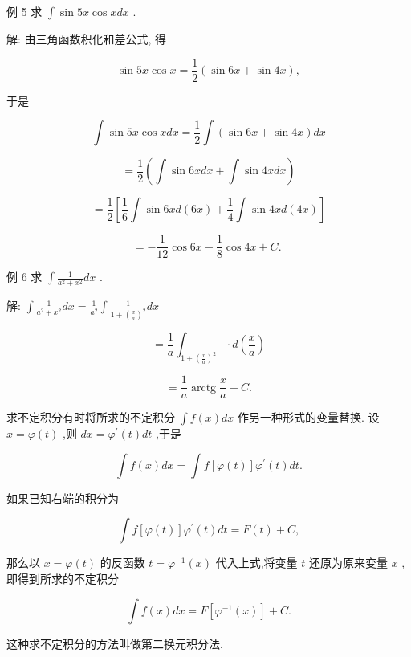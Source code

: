 \documentclass[lang=cn,newtx,12pt,scheme=chinese]{elegantbook}
\begin{document}
例 5 求 \(\int \sin {5x}\cos {xdx}\) .

解: 由三角函数积化和差公式, 得

\[
\sin {5x}\cos x = \frac{1}{2}\left( {\sin {6x} + \sin {4x}}\right) ,
\]

于是

\[
\int \sin {5x}\cos {xdx} = \frac{1}{2}\int \left( {\sin {6x} + \sin {4x}}\right) {dx}
\]

\[
= \frac{1}{2}\left( {\int \sin {6xdx}+\int \sin {4xdx}}\right)
\]

\[
= \frac{1}{2}\left\lbrack {\frac{1}{6}\int \sin {6xd}\left( {6x}\right) + \frac{1}{4}\int \sin {4xd}\left( {4x}\right) }\right\rbrack
\]

\[
= - \frac{1}{12}\cos {6x} - \frac{1}{8}\cos {4x} + C\text{. }
\]

例 6 求 \(\int \frac{1}{{a}^{2} + {x}^{2}}{dx}\) .

解: \(\int \frac{1}{{a}^{2} + {x}^{2}}{dx} = \frac{1}{{a}^{2}}\int \frac{1}{1 + {\left( \frac{x}{a}\right) }^{2}}{dx}\)

\[
= \frac{1}{a}{\int }_{1 + {\left( \frac{x}{a}\right) }^{2}} \cdot d\left( \frac{x}{a}\right)
\]

\[
= \frac{1}{a}\operatorname{arctg}\frac{x}{a} + C.
\]

\begin{proposition}[第二换元积分法]

求不定积分有时将所求的不定积分 \(\int f\left( x\right) {dx}\) 作另一种形式的变量替换. 设 \(x = \varphi \left( t\right)\) ,则 \({dx} = {\varphi }^{\prime }\left( t\right) {dt}\) ,于是

\[
\int f\left( x\right) {dx} = \int f\left\lbrack {\varphi \left( t\right) }\right\rbrack {\varphi }^{\prime }\left( t\right) {dt}.
\]

如果已知右端的积分为

\[
\int f\left\lbrack {\varphi \left( t\right) }\right\rbrack {\varphi }^{\prime }\left( t\right) {dt} = F\left( t\right) + C,
\]

那么以 \(x = \varphi \left( t\right)\) 的反函数 \(t = {\varphi }^{-1}\left( x\right)\) 代入上式,将变量 \(t\) 还原为原来变量 \(x\) ,即得到所求的不定积分

\[
\int f\left( x\right) {dx} = F\left\lbrack {{\varphi }^{-1}\left( x\right) }\right\rbrack + C.
\]

这种求不定积分的方法叫做第二换元积分法.

\end{proposition}
\end{document}

